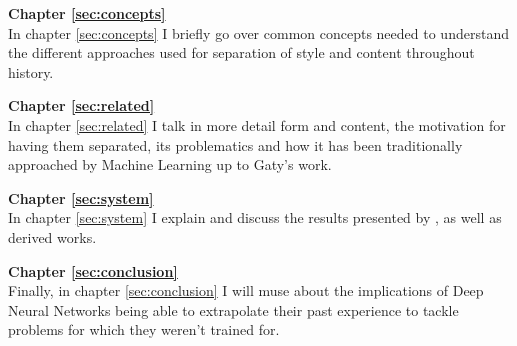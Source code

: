 \textbf{Chapter \ref{sec:concepts}} \\[0.2em]
In chapter \ref{sec:concepts} I briefly go over common concepts needed to understand the different approaches used for separation of style and content throughout history.

\textbf{Chapter \ref{sec:related}} \\[0.2em]
In chapter \ref{sec:related} I talk in more detail form and content, the motivation for having them separated, its problematics and how it has been traditionally approached by Machine Learning up to Gaty's work.

\textbf{Chapter \ref{sec:system}} \\[0.2em]
In chapter \ref{sec:system} I explain and discuss the results presented by \cite{Gatys2015}, as well as derived works.

\textbf{Chapter \ref{sec:conclusion}} \\[0.2em]
Finally, in chapter \ref{sec:conclusion} I will muse about the implications of Deep Neural Networks being able to extrapolate their past experience to tackle problems for which they weren't trained for.

